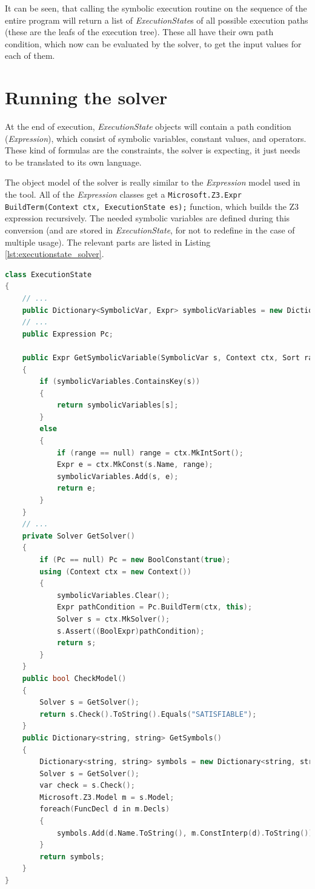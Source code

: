 It can be seen, that calling the symbolic execution routine on the sequence of the entire program will return a list of \textit{ExecutionState}s of all possible execution paths (these are the leafs of the execution tree). These all have their own path condition, which now can be evaluated by the solver, to get the input values for each of them.

\section{Running the solver}
At the end of execution, \textit{ExecutionState} objects will contain a path condition (\textit{Expression}), which consist of symbolic variables, constant values, and operators. These kind of formulas are the constraints, the solver is expecting, it just needs to be translated to its own language. 

The object model of the solver is really similar to the \textit{Expression} model used in the tool. All of the \textit{Expression} classes get a \lstinline[columns=fixed]{Microsoft.Z3.Expr BuildTerm(Context ctx, ExecutionState es);} function, which builds the Z3 expression recursively. The needed symbolic variables are defined during this conversion (and are stored in \textit{ExecutionState}, for not to redefine in the case of multiple usage). The relevant parts are listed in Listing \ref{lst:executionstate_solver}.


\begin{lstlisting}[frame=single,escapechar=@,float=!ht,caption={Calling the solver in ExecutionState},captionpos=b,label={lst:executionstate_solver},language=C++]
class ExecutionState
{
    // ...
    public Dictionary<SymbolicVar, Expr> symbolicVariables = new Dictionary<SymbolicVar, Expr>();
    // ...
    public Expression Pc;

    public Expr GetSymbolicVariable(SymbolicVar s, Context ctx, Sort range=null)
    {
        if (symbolicVariables.ContainsKey(s))
        {
            return symbolicVariables[s];
        }
        else
        {
            if (range == null) range = ctx.MkIntSort();
            Expr e = ctx.MkConst(s.Name, range);
            symbolicVariables.Add(s, e);
            return e;
        }
    }
    // ...
    private Solver GetSolver()
    {
        if (Pc == null) Pc = new BoolConstant(true);
        using (Context ctx = new Context())
        {
            symbolicVariables.Clear();
            Expr pathCondition = Pc.BuildTerm(ctx, this);
            Solver s = ctx.MkSolver();
            s.Assert((BoolExpr)pathCondition);
            return s;
        }
    }
    public bool CheckModel()
    {
        Solver s = GetSolver();
        return s.Check().ToString().Equals("SATISFIABLE");
    }
    public Dictionary<string, string> GetSymbols()
    {
        Dictionary<string, string> symbols = new Dictionary<string, string>();
        Solver s = GetSolver();
        var check = s.Check();
        Microsoft.Z3.Model m = s.Model;
        foreach(FuncDecl d in m.Decls)
        {
            symbols.Add(d.Name.ToString(), m.ConstInterp(d).ToString());
        }
        return symbols;
    }
}

\end{lstlisting}

